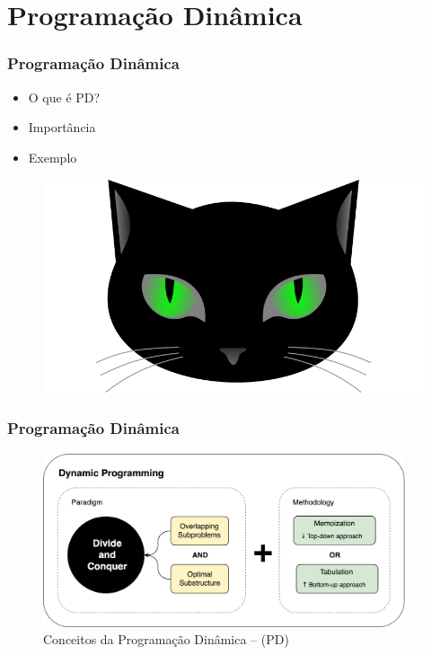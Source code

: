 
       
\section{Programação Dinâmica}

\begin{frame}
\frametitle{Programação Dinâmica}
\begin{minipage}{0.47\textwidth}
    \begin{itemize}
        \item O que é PD?
        \item Importância
        \item Exemplo
    \end{itemize}
\end{minipage}
\begin{minipage}{0.5\textwidth}
\begin{figure}[ht!]
\begin{center}
\includegraphics[width=1.2\textwidth, height=0.40\textheight]{figures/logo_picat_alex.jpg}
\end{center}
\end{figure}
\end{minipage}
\end{frame}


\begin{frame}[fragile]
\frametitle{Programação Dinâmica}

\begin{figure}[!htb]
\centering
\includegraphics[width=0.95\textwidth, height=0.70\textheight]{figures/ilustra_PD.png}
\caption{Conceitos da Programação Dinâmica -- (PD)}
\end{figure}
\end{frame}


